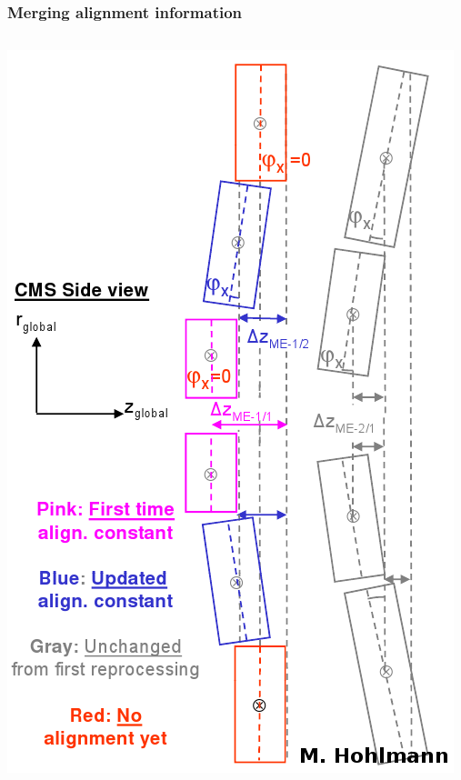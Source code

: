 \documentclass[compress]{beamer}
\begin{document}
\begin{frame}
\frametitle{Merging alignment information}

\begin{columns}
\includegraphics[width=\linewidth]{disk_bending.png}


\end{columns}
\end{frame}
\end{document}
